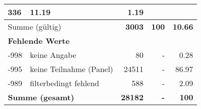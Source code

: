 \begin{longtable}{lXrrr}
       \num{336} &
       \num[round-mode=places,round-precision=2]{11.19} &
         \num[round-mode=places,round-precision=2]{1.19} \\
     \midrule
     \multicolumn{2}{l}{Summe (gültig)} &
       \textbf{\num{3003}} &
     \textbf{100} &
       \textbf{\num[round-mode=places,round-precision=2]{10.66}} \\
     \multicolumn{5}{l}{\textbf{Fehlende Werte}}\\
       -998 &
       keine Angabe &
         \num{80} &
        - &
         \num[round-mode=places,round-precision=2]{0.28} \\
       -995 &
       keine Teilnahme (Panel) &
         \num{24511} &
        - &
         \num[round-mode=places,round-precision=2]{86.97} \\
       -989 &
       filterbedingt fehlend &
         \num{588} &
        - &
         \num[round-mode=places,round-precision=2]{2.09} \\
     \midrule
     \multicolumn{2}{l}{\textbf{Summe (gesamt)}} &
          \textbf{\num{28182}} &
        \textbf{-} &
        \textbf{100} \\
     \bottomrule
     \end{longtable}
     
